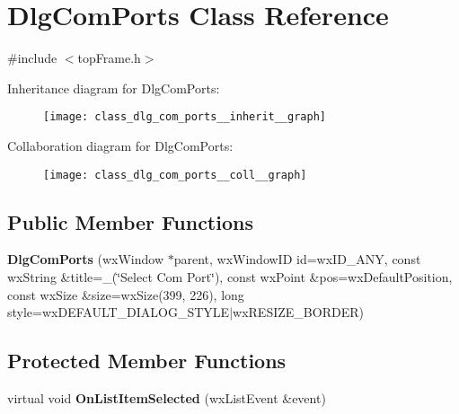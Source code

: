 \hypertarget{class_dlg_com_ports}{\section{Dlg\-Com\-Ports Class Reference}
\label{class_dlg_com_ports}
}


{\ttfamily \#include $<$top\-Frame.\-h$>$}



Inheritance diagram for Dlg\-Com\-Ports\-:\nopagebreak
\begin{figure}[H]
\begin{center}
\leavevmode
\texttt{[image: class\_dlg\_com\_ports\_\_inherit\_\_graph]}
\end{center}
\end{figure}


Collaboration diagram for Dlg\-Com\-Ports\-:\nopagebreak
\begin{figure}[H]
\begin{center}
\leavevmode
\texttt{[image: class\_dlg\_com\_ports\_\_coll\_\_graph]}
\end{center}
\end{figure}
\subsection*{Public Member Functions}
\begin{DoxyCompactItemize}
\item 
\hypertarget{class_dlg_com_ports_a3f410b6cd51d3cf06cb0b4b74963c63d}{{\bfseries Dlg\-Com\-Ports} (wx\-Window $\ast$parent, wx\-Window\-I\-D id=wx\-I\-D\-\_\-\-A\-N\-Y, const wx\-String \&title=\-\_\-(\char`\"{}Select Com Port\char`\"{}), const wx\-Point \&pos=wx\-Default\-Position, const wx\-Size \&size=wx\-Size(399, 226), long style=wx\-D\-E\-F\-A\-U\-L\-T\-\_\-\-D\-I\-A\-L\-O\-G\-\_\-\-S\-T\-Y\-L\-E$|$wx\-R\-E\-S\-I\-Z\-E\-\_\-\-B\-O\-R\-D\-E\-R)}\label{class_dlg_com_ports_a3f410b6cd51d3cf06cb0b4b74963c63d}

\end{DoxyCompactItemize}
\subsection*{Protected Member Functions}
\begin{DoxyCompactItemize}
\item 
\hypertarget{class_dlg_com_ports_a1a4cc254a36227c69954b7e7dabf3efc}{virtual void {\bfseries On\-List\-Item\-Selected} (wx\-List\-Event \&event)}\label{class_dlg_com_ports_a1a4cc254a36227c69954b7e7dabf3efc}

\end{DoxyCompactItemize}
